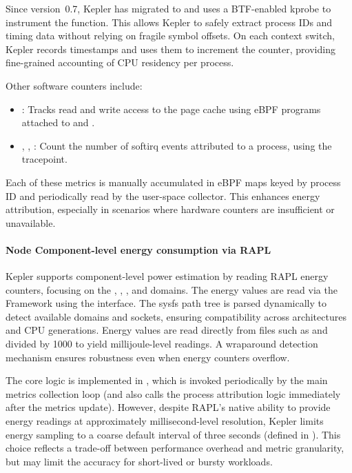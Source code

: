 Since version~0.7, Kepler has migrated to  and uses a BTF-enabled kprobe to instrument the  function. This allows Kepler to safely extract process IDs and timing data without relying on fragile symbol offsets. On each context switch, Kepler records timestamps and uses them to increment the  counter, providing fine-grained accounting of CPU residency per process.

Other software counters include:
\begin{itemize}
  \item {}: Tracks read and write access to the page cache using eBPF programs attached to  and .
  \item {}, , : Count the number of softirq events attributed to a process, using the  tracepoint.
\end{itemize}

Each of these metrics is manually accumulated in eBPF maps keyed by process ID and periodically read by the user-space collector. This enhances energy attribution, especially in scenarios where hardware counters are insufficient or unavailable.

\paragraph{Node Component-level energy consumption via RAPL}
Kepler supports component-level power estimation by reading RAPL energy counters, focusing on the , , , and  domains. The energy values are read via the  Framework using the  interface. The sysfs path tree is parsed dynamically to detect available domains and sockets, ensuring compatibility across architectures and CPU generations. Energy values are read directly from files such as  and divided by 1000 to yield millijoule-level readings. A wraparound detection mechanism ensures robustness even when energy counters overflow.

The core logic is implemented in , which is invoked periodically by the main metrics collection loop (and also calls the process attribution logic immediately after the metrics update). However, despite RAPL's native ability to provide energy readings at approximately millisecond-level resolution, Kepler limits energy sampling to a coarse default interval of three seconds (defined in ). This choice reflects a trade-off between performance overhead and metric granularity, but may limit the accuracy for short-lived or bursty workloads.

